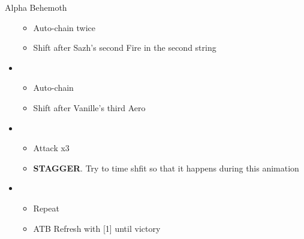 \begin{paracol}{2}
\begin{battle}{Alpha Behemoth}
\begin{itemize}
\begin{itemize}
				      \item Auto-chain twice
				      \item Shift after Sazh's second Fire in the second string
			      \end{itemize}
			\item \fourth
			      \begin{itemize}
				      \item Auto-chain
				      \item Shift after Vanille's third Aero
			      \end{itemize}
			\item \first
			      \begin{itemize}
				      \item Attack x3
				      \item \textbf{STAGGER}. Try to time shfit so that it happens during this animation
			      \end{itemize}
			\item \fifth
			      \begin{itemize}
				      \item Repeat
				      \item ATB Refresh with [1] until victory
			      \end{itemize}
		\end{itemize}
	\end{battle}
	\switchcolumn*



	 

	\switchcolumn



	 
	\switchcolumn*


\end{paracol}
